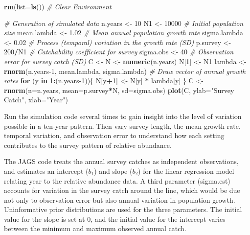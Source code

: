 \documentclass[
]{krantz}
\makeatletter
\newenvironment{Shaded}{\begin{snugshade}}{\end{snugshade}}
\newcommand{\AttributeTok}[1]{\textcolor[rgb]{0.27,0.27,0.27}{#1}}
\newcommand{\CommentTok}[1]{\textcolor[rgb]{0.37,0.37,0.37}{\textit{#1}}}
\newcommand{\ControlFlowTok}[1]{\textcolor[rgb]{0.27,0.27,0.27}{\textbf{#1}}}
\newcommand{\DecValTok}[1]{\textcolor[rgb]{0.06,0.06,0.06}{#1}}
\newcommand{\FloatTok}[1]{\textcolor[rgb]{0.06,0.06,0.06}{#1}}
\newcommand{\FunctionTok}[1]{\textcolor[rgb]{0.27,0.27,0.27}{\textbf{#1}}}
\newcommand{\NormalTok}[1]{#1}
\newcommand{\OtherTok}[1]{\textcolor[rgb]{0.37,0.37,0.37}{#1}}
\newcommand{\SpecialCharTok}[1]{\textcolor[rgb]{0.43,0.43,0.43}{\textbf{#1}}}
\newcommand{\StringTok}[1]{\textcolor[rgb]{0.5,0.5,0.5}{#1}}
\newenvironment{kframe}{%
\medskip{}
\setlength{\fboxsep}{.8em}
 \def\at@end@of@kframe{}%
 \ifinner\ifhmode%
  \def\at@end@of@kframe{\end{minipage}}%
  \begin{minipage}{\columnwidth}%
 \fi\fi%
 \def\FrameCommand##1{\hskip\@totalleftmargin \hskip-\fboxsep
 \colorbox{shadecolor}{##1}\hskip-\fboxsep
     \hskip-\linewidth \hskip-\@totalleftmargin \hskip\columnwidth}%
 \MakeFramed {\advance\hsize-\width
   \@totalleftmargin\z@ \linewidth\hsize
   \@setminipage}}%
 {\par\unskip\endMakeFramed%
 \at@end@of@kframe}
\renewenvironment{Shaded}{\begin{kframe}}{\end{kframe}}
\makeatother
\begin{document}
\begin{Shaded}
\begin{Highlighting}[]
\FunctionTok{rm}\NormalTok{(}\AttributeTok{list=}\FunctionTok{ls}\NormalTok{()) }\CommentTok{\# Clear Environment}

\CommentTok{\# Generation of simulated data}
\NormalTok{n.years }\OtherTok{\textless{}{-}} \DecValTok{10}
\NormalTok{N1 }\OtherTok{\textless{}{-}} \DecValTok{10000}  \CommentTok{\# Initial population size}
\NormalTok{mean.lambda }\OtherTok{\textless{}{-}} \FloatTok{1.02} \CommentTok{\# Mean annual population growth rate}
\NormalTok{sigma.lambda }\OtherTok{\textless{}{-}} \FloatTok{0.02} \CommentTok{\# Process (temporal) variation in the growth rate (SD)}
\NormalTok{p.survey }\OtherTok{\textless{}{-}} \DecValTok{200}\SpecialCharTok{/}\NormalTok{N1 }\CommentTok{\# Catchability coefficient for survey}
\NormalTok{sigma.obs }\OtherTok{\textless{}{-}} \DecValTok{40} \CommentTok{\# Observation error for survey catch (SD)}
\NormalTok{C }\OtherTok{\textless{}{-}}\NormalTok{ N }\OtherTok{\textless{}{-}} \FunctionTok{numeric}\NormalTok{(n.years)}
\NormalTok{N[}\DecValTok{1}\NormalTok{] }\OtherTok{\textless{}{-}}\NormalTok{ N1}
\NormalTok{lambda }\OtherTok{\textless{}{-}} \FunctionTok{rnorm}\NormalTok{(n.years}\DecValTok{{-}1}\NormalTok{, mean.lambda, sigma.lambda) }\CommentTok{\# Draw vector of annual growth rates}
\ControlFlowTok{for}\NormalTok{ (y }\ControlFlowTok{in} \DecValTok{1}\SpecialCharTok{:}\NormalTok{(n.years}\DecValTok{{-}1}\NormalTok{))\{}
\NormalTok{  N[y}\SpecialCharTok{+}\DecValTok{1}\NormalTok{] }\OtherTok{\textless{}{-}}\NormalTok{ N[y] }\SpecialCharTok{*}\NormalTok{ lambda[y]}
\NormalTok{\}}
\NormalTok{C }\OtherTok{\textless{}{-}} \FunctionTok{rnorm}\NormalTok{(}\AttributeTok{n=}\NormalTok{n.years, }\AttributeTok{mean=}\NormalTok{p.survey}\SpecialCharTok{*}\NormalTok{N, }\AttributeTok{sd=}\NormalTok{sigma.obs)}
\FunctionTok{plot}\NormalTok{(C, }\AttributeTok{ylab=}\StringTok{"Survey Catch"}\NormalTok{, }\AttributeTok{xlab=}\StringTok{"Year"}\NormalTok{)}
\end{Highlighting}
\end{Shaded}

Run the simulation code several times to gain insight into the level of variation possible in a ten-year pattern. Then vary survey length, the mean growth rate, temporal variation, and observation error to understand how each setting contributes to the survey pattern of relative abundance.

The JAGS code treats the annual survey catches as independent observations, and estimates an intercept (\(b_1\)) and slope (\(b_2\)) for the linear regression model relating year to the relative abundance data. A third parameter (sigma.est) accounts for variation in the survey catch around the line, which would be due not only to observation error but also annual variation in population growth. Uninformative prior distributions are used for the three parameters. The initial value for the slope is set at 0, and the initial value for the intercept varies between the minimum and maximum observed annual catch.
\end{document}
